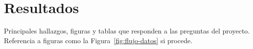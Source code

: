 \chapter{Resultados}

Principales hallazgos, figuras y tablas que responden a las preguntas del proyecto. Referencia a figuras como la Figura~\ref{fig:flujo-datos} si procede.
